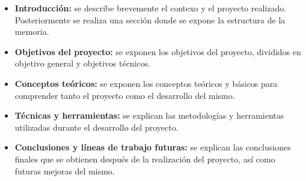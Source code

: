 \begin{itemize}
\item 
\textbf{Introducción:} se describe brevemente el contexo y el proyecto realizado. Posteriormente se realiza una sección donde se expone la estructura de la memoria.
\item 
\textbf{Objetivos del proyecto:} se exponen los objetivos del proyecto, divididos en objetivo general y objetivos técnicos.
\item
\textbf{Conceptos teóricos:} se exponen los conceptos teóricos y básicos para comprender tanto el proyecto como el desarrollo del mismo.
\item
\textbf{Técnicas y herramientas:} se explican las metodologías y herramientas utilizadas durante el desarrollo del proyecto.
\item
\textbf{Conclusiones y líneas de trabajo futuras:} se explican las conclusiones finales que se obtienen después de la realización del proyecto, así como futuras mejoras del mismo.
\end{itemize}